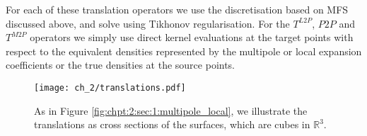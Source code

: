 For each of these translation operators we use the discretisation based on MFS discussed above, and solve using Tikhonov regularisation. For the  $T^{L2P}$, $P2P$ and $T^{M2P}$ operators we simply use direct kernel evaluations at the target points with respect to the equivalent densities represented by the multipole or local expansion coefficients or the true densities at the source points.

\begin{figure}
    \centering
    \texttt{[image: ch\_2/translations.pdf]}
    \caption{ As in Figure \ref{fig:chpt:2:sec:1:multipole_local}, we illustrate the translations as cross sections of the surfaces, which are cubes in $\mathbb{R}^3$.}
    \label{fig:chpt:2:sec:1:translations}
\end{figure}

